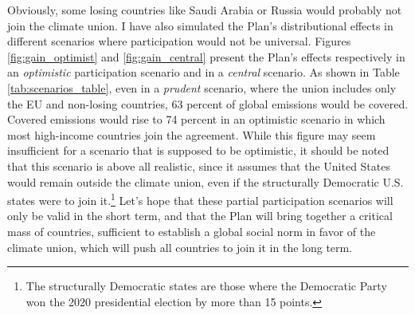 \documentclass[a5paper,english,openany]{memoir}
\begin{document}
Obviously, some losing countries like Saudi Arabia or Russia would probably not join the climate union. I have also simulated the Plan's distributional effects in different scenarios where participation would not be universal. Figures \ref{fig:gain_optimist} and \ref{fig:gain_central} present the Plan's effects respectively in an \textit{optimistic} participation scenario and in a \textit{central} scenario. As shown in Table \ref{tab:scenarios_table}, even in a \textit{prudent} scenario, where the union includes only the EU and non-losing countries, %
63 percent  %
of global emissions would be covered. Covered emissions would rise to 74 percent %
in an optimistic scenario in which %
most high-income countries join the agreement. While this figure may seem insufficient for a scenario that is supposed to be optimistic, it should be noted that this scenario is above all realistic, since it assumes that the United States would remain outside the climate union, even if the structurally Democratic U.S. states were to join it.\footnote{The structurally Democratic states are those where the Democratic Party won the 2020 presidential election by more than 15 points.} Let's hope %
that these partial participation scenarios will only be valid in the short term, and that the Plan will bring together a critical mass of countries, sufficient to establish a global social norm in favor of the climate union, which will push all countries to join it in the long term. %
\end{document}
